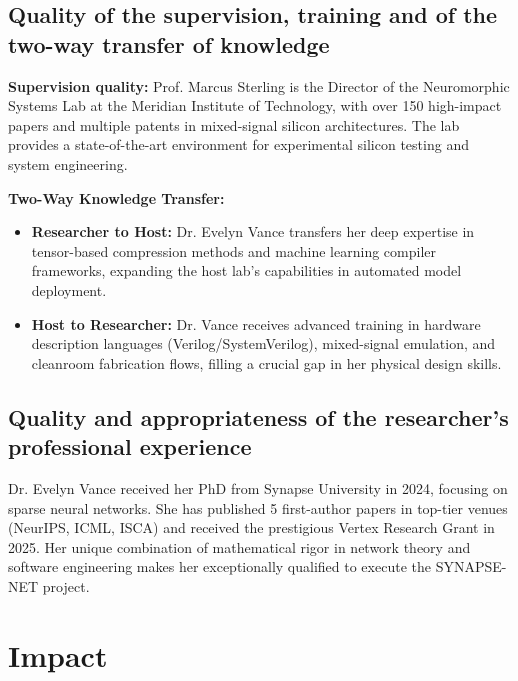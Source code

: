 \documentclass[11pt,a4paper]{article}
\begin{document}
\subsection{Quality of the supervision, training and of the two-way transfer of knowledge}
\textbf{Supervision quality:} Prof. Marcus Sterling is the Director of the Neuromorphic Systems Lab at the Meridian Institute of Technology, with over 150 high-impact papers and multiple patents in mixed-signal silicon architectures. The lab provides a state-of-the-art environment for experimental silicon testing and system engineering.
\par
\textbf{Two-Way Knowledge Transfer:}
\begin{itemize}[leftmargin=*]
  \item \textbf{Researcher to Host:} Dr. Evelyn Vance transfers her deep expertise in tensor-based compression methods and machine learning compiler frameworks, expanding the host lab's capabilities in automated model deployment.
  \item \textbf{Host to Researcher:} Dr. Vance receives advanced training in hardware description languages (Verilog/SystemVerilog), mixed-signal emulation, and cleanroom fabrication flows, filling a crucial gap in her physical design skills.
\end{itemize}

\subsection{Quality and appropriateness of the researcher's professional experience}
Dr. Evelyn Vance received her PhD from Synapse University in 2024, focusing on sparse neural networks. She has published 5 first-author papers in top-tier venues (NeurIPS, ICML, ISCA) and received the prestigious Vertex Research Grant in 2025. Her unique combination of mathematical rigor in network theory and software engineering makes her exceptionally qualified to execute the SYNAPSE-NET project.

\newpage

\section{Impact}
\end{document}
